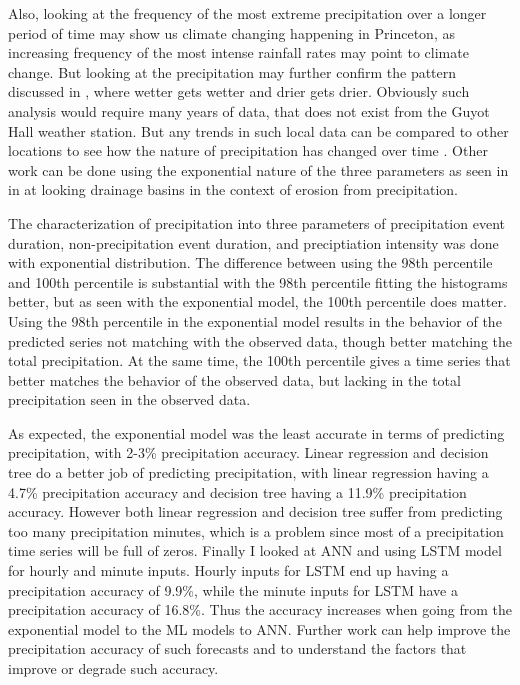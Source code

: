 \documentclass[11pt]{report}
\begin{document}
Also, looking at the frequency of the most extreme precipitation over a longer period of time may show us climate changing happening in Princeton, as increasing frequency of the most intense rainfall rates may point to climate change. But looking at the precipitation may further confirm the pattern discussed in \cite{Held}, where wetter gets wetter and drier gets drier. Obviously such analysis would require many years of data, that does not exist from the Guyot Hall weather station. But any trends in such local data can be compared to other locations to see how the nature of precipitation has changed over time \cite[]{AUST}. Other work can be done using the exponential nature of the three parameters as seen in \cite{Tucker} in at looking drainage basins in the context of erosion from precipitation. 

The characterization of precipitation into three parameters of precipitation event duration, non-precipitation event duration, and preciptiation intensity was done with exponential distribution. The difference between using the 98th percentile and 100th percentile is substantial with the 98th percentile fitting the histograms better, but as seen with the exponential model, the 100th percentile does matter. Using the 98th percentile in the exponential model results in the behavior of the predicted series not matching with the observed data, though better matching the total precipitation.
At the same time, the 100th percentile gives a time series that better matches the behavior of the observed data, but lacking in the total precipitation seen in the observed data. 

As expected, the exponential model was the least accurate in terms of predicting precipitation, with 2-3\% precipitation accuracy. Linear regression and decision tree do a better job of predicting precipitation, with linear regression having a 4.7\% precipitation accuracy and decision tree having a 11.9\% precipitation accuracy. However both linear regression and decision tree suffer from predicting too many precipitation minutes, which is a problem since most of a precipitation time series will be full of zeros. Finally I looked at ANN and using LSTM model for hourly and minute inputs. Hourly inputs for LSTM end up having a precipitation accuracy of 9.9\%, while the minute inputs for LSTM have a precipitation accuracy of 16.8\%. Thus the accuracy increases when going from the exponential model to the ML models to ANN. Further work can help improve the precipitation accuracy of such forecasts and to understand the factors that improve or degrade such accuracy. 
\small
\renewcommand{\bibsep}{0em}
\end{document}
